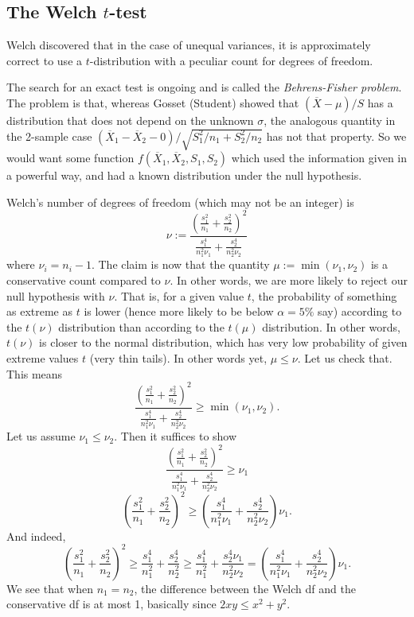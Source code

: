 {%
\subsection{The Welch $t$-test}
Welch discovered that in the case of unequal variances, it is approximately correct to use a $t$-distribution with a peculiar count for degrees of freedom.

The search for an exact test is ongoing and is called the \emph{Behrens-Fisher problem}. The problem is that, whereas Gosset (Student) showed that $(\overline X-\mu)/S$ has a distribution that does not depend on the unknown $\sigma$, the analogous quantity in the 2-sample case $(\overline X_1-\overline X_2-0)/\sqrt{S^2_1/n_1+S^2_2/n_2}$ has not that property. So we would want some function $f(\overline X_1,\overline X_2,S_1,S_2)$ which used the information given in a powerful way, and had a known distribution under the null hypothesis.

Welch's number of degrees of freedom (which may not be an integer) is
\[
	\nu :=
	\frac{
		\left(
			 \frac{s_1^2}{n_1}
			+\frac{s_2^2}{n_2}
		\right)^2
	}{
			 \frac{s_1^4}{n_1^2\nu_1}
			+\frac{s_2^4}{n_2^2\nu_2}
	}
\]
where $\nu_i=n_i-1$. The claim is now that the quantity $\mu:=\min(\nu_1,\nu_2)$ is a conservative count compared to $\nu$. In other words, we are more likely to reject our null hypothesis with $\nu$. That is, for a given value $t$, the probability of something as extreme as $t$ is lower (hence more likely to be below $\alpha=5\%$ say) according to the $t(\nu)$ distribution than according to the $t(\mu)$ distribution. In other words, $t(\nu)$ is closer to the normal distribution, which has very low probability of given extreme values $t$ (very thin tails). In other words yet, $\mu\le\nu$. Let us check that. This means
\[
	\frac{\left(
			\frac{s_1^2}{n_1}+\frac{s_2^2}{n_2}
		\right)^2}{
			\frac{s_1^4}{n_1^2\nu_1}+\frac{s_2^4}{n_2^2\nu_2}
		}
		\ge \min(\nu_1,\nu_2).
\]
Let us assume $\nu_1\le \nu_2$. Then it suffices to show
\[
	\frac{\left(
			\frac{s_1^2}{n_1}+\frac{s_2^2}{n_2}
		\right)^2}{
			\frac{s_1^4}{n_1^2\nu_1}+\frac{s_2^4}{n_2^2\nu_2}
		}
		\ge \nu_1
\]
\[
	\left(
		\frac{s_1^2}{n_1}+\frac{s_2^2}{n_2}
	\right)^2
	\ge
		\left(\frac{s_1^4}{n_1^2\nu_1}+\frac{s_2^4}{n_2^2\nu_2}\right)
	\nu_1.
\]
And indeed,
\[
	\left(
		\frac{s_1^2}{n_1}+\frac{s_2^2}{n_2}
	\right)^2
	\ge
	\frac{s_1^4}{n_1^2}+\frac{s_2^4}{n_2^2}
	\ge
	\frac{s_1^4}{n_1^2}+\frac{s_2^4\nu_1}{n_2^2\nu_2}
	=
		\left(\frac{s_1^4}{n_1^2\nu_1}+\frac{s_2^4}{n_2^2\nu_2}\right)
	\nu_1.
\]
We see that when $n_1=n_2$, the difference between the Welch df and the conservative df is at most 1, basically since $2xy\le x^2+y^2$.

}
